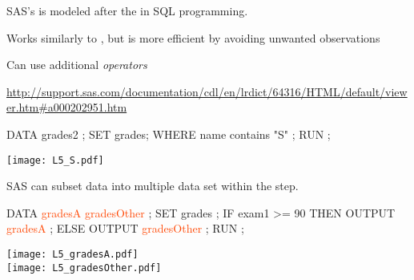 \begin{frame}[fragile]
\bi
\item SAS's  is modeled after the  in SQL programming.
\item Works similarly to , but is more efficient by avoiding unwanted observations
\item Can use additional \emph{operators}
\item[] \url{http://support.sas.com/documentation/cdl/en/lrdict/64316/HTML/default/viewer.htm#a000202951.htm}
\ei
\hspace*{0.2in}
\footnotesize
\begin{code}{.0}
DATA grades2 ;
   SET grades;
   WHERE name contains "S" ;
RUN ;
\end{code}
\emp
{} \hspace{0.05in} \emp
{}
\texttt{[image: L5\_S.pdf]}\emp
\end{frame}

\begin{frame}[fragile]
SAS can subset data into multiple data set within the   step.
\hspace*{-0.2in}
\footnotesize
\begin{code}{.0}
DATA \textcolor{OrangeRed}{gradesA} \textcolor{OrangeRed}{gradesOther} ;
   SET grades ;
   IF exam1 >= 90 THEN OUTPUT \textcolor{OrangeRed}{gradesA} ;
   ELSE OUTPUT \textcolor{OrangeRed}{gradesOther} ;
RUN ;
\end{code}
\emp
{} \hspace{0.05in} \emp
{}
\texttt{[image: L5\_gradesA.pdf]} \\
\texttt{[image: L5\_gradesOther.pdf]}
\emp
\end{frame}

 